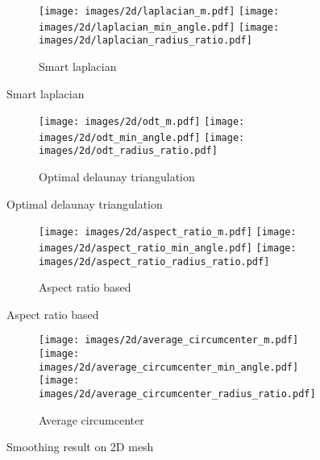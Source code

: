 \begin{figure}[H]
	\ContinuedFloat
    \centering
    \begin{subfigure}[b]{1.0\textwidth}
        \texttt{[image: images/2d/laplacian\_m.pdf]}
        \texttt{[image: images/2d/laplacian\_min\_angle.pdf]}
        \texttt{[image: images/2d/laplacian\_radius\_ratio.pdf]}
        \caption{Smart laplacian}       
        \label{fig:avg_sl_2d}        
    \end{subfigure}
\end{figure}

\begin{figure}[H]
	\ContinuedFloat
    \centering
    \begin{subfigure}[b]{1.0\textwidth}
        \texttt{[image: images/2d/odt\_m.pdf]}
        \texttt{[image: images/2d/odt\_min\_angle.pdf]}
        \texttt{[image: images/2d/odt\_radius\_ratio.pdf]}
        \caption{Optimal delaunay triangulation}       
        \label{fig:odt_2d}        
    \end{subfigure}
\end{figure}

\begin{figure}[H]
	\ContinuedFloat
    \centering
    \begin{subfigure}[b]{1.0\textwidth}
        \texttt{[image: images/2d/aspect\_ratio\_m.pdf]}
        \texttt{[image: images/2d/aspect\_ratio\_min\_angle.pdf]}
        \texttt{[image: images/2d/aspect\_ratio\_radius\_ratio.pdf]}
        \caption{Aspect ratio based}       
        \label{fig:avg_ar_2d}
    \end{subfigure} 
\end{figure}

\begin{figure}[H]
	\ContinuedFloat
    \centering
    \begin{subfigure}[b]{1.0\textwidth}
        \texttt{[image: images/2d/average\_circumcenter\_m.pdf]}
        \texttt{[image: images/2d/average\_circumcenter\_min\_angle.pdf]}
        \texttt{[image: images/2d/average\_circumcenter\_radius\_ratio.pdf]}
        \caption{Average circumcenter}       
        \label{fig:avg_cc_2d}
    \end{subfigure}
    \caption{Smoothing result on 2D mesh}
    \label{fig:2d}
    \vspace{0.5 cm}
\end{figure}

